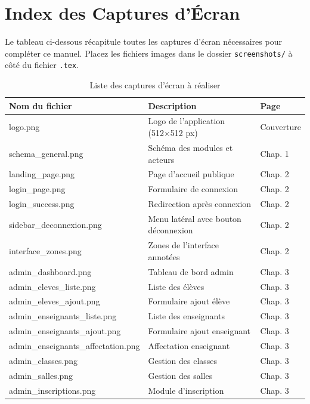 \documentclass[12pt, a4paper, twoside, openright]{report}
\begin{document}
\chapter{Index des Captures d'Écran}
\label{app:index_screenshots}

Le tableau ci-dessous récapitule toutes les captures d'écran nécessaires pour compléter ce manuel. Placez les fichiers images dans le dossier \texttt{screenshots/} à côté du fichier \texttt{.tex}.

\begin{table}[htbp]
  \centering
  \caption{Liste des captures d'écran à réaliser}
  \small
  \begin{tabularx}{\textwidth}{>{\ttfamily\small}p{5.5cm} X l}
    \toprule
    \textbf{Nom du fichier} & \textbf{Description} & \textbf{Page} \\
    \midrule
    logo.png & Logo de l'application (512×512 px) & Couverture \\
    schema\_general.png & Schéma des modules et acteurs & Chap. 1 \\
    landing\_page.png & Page d'accueil publique & Chap. 2 \\
    login\_page.png & Formulaire de connexion & Chap. 2 \\
    login\_success.png & Redirection après connexion & Chap. 2 \\
    sidebar\_deconnexion.png & Menu latéral avec bouton déconnexion & Chap. 2 \\
    interface\_zones.png & Zones de l'interface annotées & Chap. 2 \\
    admin\_dashboard.png & Tableau de bord admin & Chap. 3 \\
    admin\_eleves\_liste.png & Liste des élèves & Chap. 3 \\
    admin\_eleves\_ajout.png & Formulaire ajout élève & Chap. 3 \\
    admin\_enseignants\_liste.png & Liste des enseignants & Chap. 3 \\
    admin\_enseignants\_ajout.png & Formulaire ajout enseignant & Chap. 3 \\
    admin\_enseignants\_affectation.png & Affectation enseignant & Chap. 3 \\
    admin\_classes.png & Gestion des classes & Chap. 3 \\
    admin\_salles.png & Gestion des salles & Chap. 3 \\
    admin\_inscriptions.png & Module d'inscription & Chap. 3 \\

\end{tabularx}
\end{table}
\end{document}
